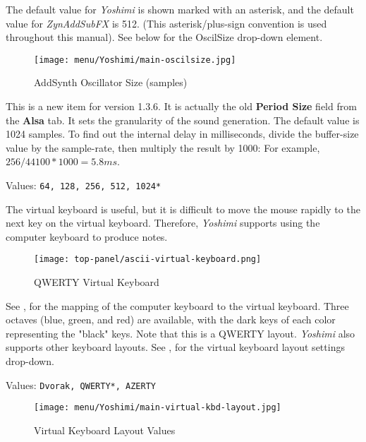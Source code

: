    The default value for \textsl{Yoshimi} is shown marked with an asterisk,
   and the default value for \textsl{ZynAddSubFX} is 512.
   (This asterisk/plus-sign convention is used throughout this manual).
   See  below for the OscilSize
   drop-down element.

\begin{figure}[H]
   \centering 
   \texttt{[image: menu/Yoshimi/main-oscilsize.jpg]}
   \caption[OscilSize Values]{AddSynth Oscillator Size (samples)}
   \label{fig:yoshimi_oscilsize_values}
\end{figure}

   This is a new item for version 1.3.6.  It is actually the old
   \textbf{Period Size} field from the \textbf{Alsa} tab.
   It sets the granularity of the sound generation.
   The default value is 1024 samples.
   To find out the internal delay in milliseconds, divide the
   buffer-size value by the sample-rate, then multiply the result by 1000:
   For example, \(256 / 44100 * 1000 = 5.8 ms\).

   Values: \texttt{64, 128, 256, 512, 1024*}

   The virtual keyboard is useful, but it is difficult to move the mouse
   rapidly to the next key on the virtual keyboard.
   Therefore, \textsl{Yoshimi} supports using the computer keyboard
   to produce notes.

\begin{figure}[H]
   \centering 
   \texttt{[image: top-panel/ascii-virtual-keyboard.png]}
   \caption{QWERTY Virtual Keyboard}
   \label{fig:qwerty_virtual_keyboard}
\end{figure}

   See ,
   for the mapping of the computer keyboard to the
   virtual keyboard.
   Three octaves (blue, green, and red) are available, with the dark keys of
   each color representing the "black" keys.
   Note that this is a QWERTY layout.  
   \textsl{Yoshimi} also supports other keyboard layouts.
   See ,
   for the virtual keyboard
   layout settings drop-down.

   Values: \texttt{Dvorak, QWERTY*, AZERTY}

\begin{figure}[H]
   \centering 
   \texttt{[image: menu/Yoshimi/main-virtual-kbd-layout.jpg]}
   \caption[Virtual Keyboard Layout]{Virtual Keyboard Layout Values}
   \label{fig:virtual_kbd_layout} 
\end{figure}

